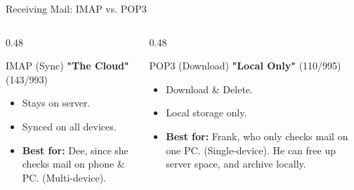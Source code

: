 \documentclass[aspectratio=169]{beamer}  %
\begin{document}
\begin{frame}{Receiving Mail: IMAP vs. POP3}
    \begin{columns}[T]
        \begin{column}{0.48\textwidth}
            \begin{block}{IMAP (Sync)}
                \small
                \textbf{"The Cloud"} (143/993)
                \begin{itemize}
                    \item Stays on server.
                    \item Synced on all devices.
                    \item \textbf{Best for:} Dee, since she checks mail on phone \& PC. (Multi-device).
                \end{itemize}
            \end{block}
        \end{column}
        \begin{column}{0.48\textwidth}
            \begin{block}{POP3 (Download)}
                \small
                \textbf{"Local Only"} (110/995)
                \begin{itemize}
                    \item Download \& Delete. %
                    \item Local storage only.
                    \item \textbf{Best for:} Frank, who only checks mail on one PC. (Single-device). He can free up server space, and archive locally.
                \end{itemize}
            \end{block}
        \end{column}
    \end{columns}
    \begin{center}
    \end{center}
\end{frame}
\end{document}
